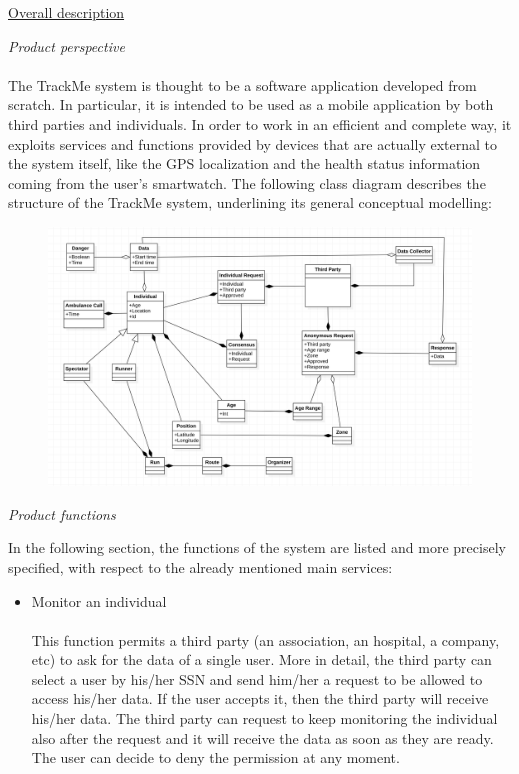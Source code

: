 \documentclass{article}
\begin{document}
\begin{legal}
  	\item \underline{Overall description}
  		\begin{legal}
    		\item \textit{Product perspective}\\\\
			{\normalfont
The TrackMe system is thought to be a software application developed from scratch. In particular, it is intended to be used as a mobile application by both third parties and individuals.
In order to work in an efficient and complete way, it exploits services and functions provided by devices that are actually external to the system itself, like the GPS 				localization and the health status information coming from the user’s smartwatch.
The following class diagram describes the structure of the TrackMe system, underlining its general conceptual modelling:
			}
			\begin{figure}[H]
  			\includegraphics[width=\linewidth]{./images/UML1-0.png}
			\end{figure}
		\item \textit{Product functions} \\
		{\normalfont
In the following section, the functions of the system are listed and more precisely specified, with
respect to the already mentioned main services:
		\begin{itemize}
		\item Monitor an individual\\\\
		This function permits a third party (an association, an hospital, a company, etc) to ask for the data of a single user. More in detail, the third party can select a user by his/her SSN and send him/her a request to be allowed to access his/her data. If the user accepts it, then the third party will receive his/her data. The third party can request to keep monitoring the individual also after the request and it will receive the data as soon as they are ready. The user can decide to deny the permission at any moment. \\

\end{itemize}}
\end{legal}
\end{legal}
\end{document}
